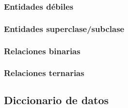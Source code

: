 \documentclass[12pt]{article}
\begin{document}
\subsubsection{Entidades d\'ebiles}
\subsubsection{Entidades superclase/subclase}
\subsubsection{Relaciones binarias}
\subsubsection{Relaciones ternarias}

\subsection{Diccionario de datos}
\end{document}
